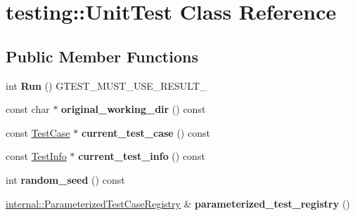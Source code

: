 \hypertarget{classtesting_1_1_unit_test}{}\section{testing\+:\+:Unit\+Test Class Reference}
\label{classtesting_1_1_unit_test}
\subsection*{Public Member Functions}
\begin{DoxyCompactItemize}
\item 
\mbox{\label{classtesting_1_1_unit_test_a2febc800536b44500565f4c423f359d3}} 
int {\bfseries Run} () G\+T\+E\+S\+T\+\_\+\+M\+U\+S\+T\+\_\+\+U\+S\+E\+\_\+\+R\+E\+S\+U\+L\+T\+\_\+
\item 
\mbox{\label{classtesting_1_1_unit_test_af6809b7747785c80f7a2f31f6b39b152}} 
const char $\ast$ {\bfseries original\+\_\+working\+\_\+dir} () const
\item 
\mbox{\label{classtesting_1_1_unit_test_a674b16245dbd52baeabfd61ad5a733f1}} 
const \mbox{\hyperlink{classtesting_1_1_test_case}{Test\+Case}} $\ast$ {\bfseries current\+\_\+test\+\_\+case} () const
\item 
\mbox{\label{classtesting_1_1_unit_test_a0d95e1645ecd1c55c268710617787765}} 
const \mbox{\hyperlink{classtesting_1_1_test_info}{Test\+Info}} $\ast$ {\bfseries current\+\_\+test\+\_\+info} () const
\item 
\mbox{\label{classtesting_1_1_unit_test_adddc090a06f2d3a0e68f3762ee262688}} 
int {\bfseries random\+\_\+seed} () const
\item 
\mbox{\label{classtesting_1_1_unit_test_a92c4025888706cd1016a11bf97bcf02e}} 
\mbox{\hyperlink{classtesting_1_1internal_1_1_parameterized_test_case_registry}{internal\+::\+Parameterized\+Test\+Case\+Registry}} \& {\bfseries parameterized\+\_\+test\+\_\+registry} ()
\item 
\mbox{\label{classtesting_1_1_unit_test_acaa2ab71f53c25ffe0242a91c14e173f}} 

\end{DoxyCompactItemize}
